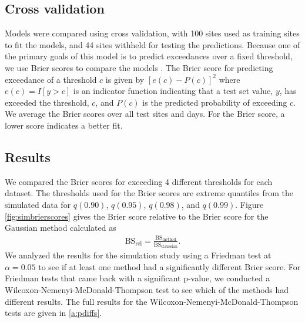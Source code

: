 \documentclass[useAMS,usenatbib,referee]{biom}
\providecommand{\DIFadd}[1]{{\protect\color{blue}\uwave{#1}}} %
\providecommand{\DIFaddbegin}{} %
\providecommand{\DIFaddend}{} %
\begin{document}
\subsection{Cross validation}\label{s:modelselect}
Models were compared using cross validation, with 100 sites used as training sites to fit the models, and 44 sites withheld for testing the predictions.
Because one of the primary goals of this model is to predict exceedances over a fixed threshold, we use Brier scores to compare the models \citep{Gneiting2007}.
The Brier score for predicting exceedance of a threshold $c$ is given by $[e(c) - P(c)]^2$ where $e(c) = I[y>c]$ is an indicator function indicating that a test set value, $y$, has exceeded the threshold, $c$, and $P(c)$ is the predicted probability of exceeding $c$.
We average the Brier scores over all test sites and days.
For the Brier score, a lower score indicates a better fit.

\subsection{Results}\label{s:simresults}
We compared the Brier scores for exceeding 4 different thresholds for each dataset.
The thresholds used for the Brier scores are extreme quantiles from the simulated data for $q(0.90)$, $q(0.95)$, $q(0.98)$, and $q(0.99)$.
Figure \ref{fig:simbrierscores} gives the Brier score relative to the Brier score for the Gaussian method calculated as
\begin{align}
  \text{BS}_{\text{rel}} = \frac{\text{BS}_{\text{method}}}{\text{BS}_{\text{Gaussian}}}.
\end{align}
We analyzed the results for the simulation study using a Friedman test at $\alpha = 0.05$ to see if at least one method had a significantly different Brier score.
For Friedman tests that came back with a significant p-value, we conducted a Wilcoxon-Nemenyi-McDonald-Thompson \DIFaddbegin \DIFadd{\mbox{%
\citep{Hollander2014} }%
}\DIFaddend test to see which of the methods had different results.
The full results for the Wilcoxon-Nemenyi-McDonald-Thompson tests are given in \ref{a:pdiffs}.
\end{document}
